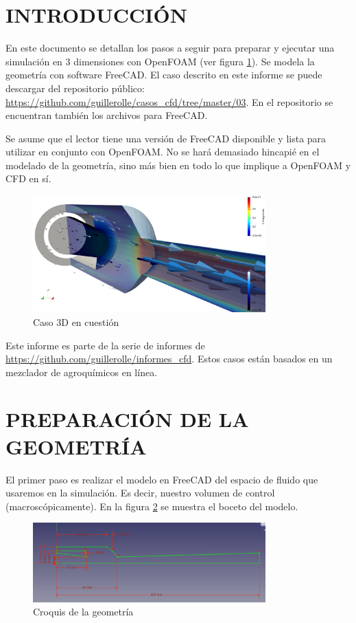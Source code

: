 \documentclass[oneside,a4paper,spanish,links]{amca}
\begin{document}
\section{INTRODUCCIÓN}
En este documento se detallan los pasos a seguir para preparar y ejecutar una simulación en 3 dimensiones con OpenFOAM (ver figura \ref{fg:intro}). Se modela la geometría con software FreeCAD. El caso descrito en este informe se puede descargar del repositorio público: \url{https://github.com/guillerolle/casos_cfd/tree/master/03}. En el repositorio se encuentran también los archivos para FreeCAD.

Se asume que el lector tiene una versión de FreeCAD disponible y lista para utilizar en conjunto con OpenFOAM. No se hará demasiado hincapié en el modelado de la geometría, sino más bien en todo lo que implique a OpenFOAM y CFD en sí.

\begin{figure}[htb]
	\centerline{\includegraphics[width=0.8\textwidth]{Figuras/05_GLYPH.png}} \caption{Caso 3D en cuestión} \label{fg:intro}
\end{figure}

Este informe es parte de la serie de informes de \url{https://github.com/guillerolle/informes_cfd}. Estos casos están basados en un mezclador de agroquímicos en línea.

\section{PREPARACIÓN DE LA GEOMETRÍA}
El primer paso es realizar el modelo en FreeCAD del espacio de fluido que usaremos en la simulación. Es decir, nuestro volumen de control (macroscópicamente). En la figura \ref{fg:boceto_revo} se muestra el boceto del modelo. 

\begin{figure}[htb]
	\centerline{\includegraphics[width=0.8\textwidth]{Figuras/02_BOCETO_REVOLUCION.png}} \caption{Croquis de la geometría} \label{fg:boceto_revo}
\end{figure}
\end{document}
